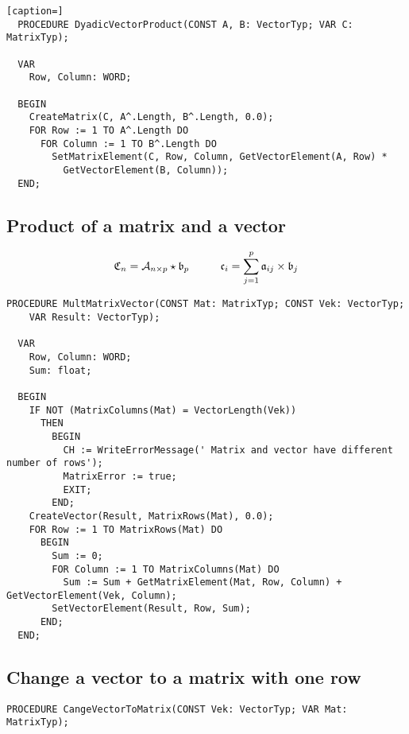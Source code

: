 \begin{refsection}
\begin{lstlisting}[caption=]
  PROCEDURE DyadicVectorProduct(CONST A, B: VectorTyp; VAR C: MatrixTyp);

  VAR
    Row, Column: WORD;

  BEGIN
    CreateMatrix(C, A^.Length, B^.Length, 0.0);
    FOR Row := 1 TO A^.Length DO
      FOR Column := 1 TO B^.Length DO
        SetMatrixElement(C, Row, Column, GetVectorElement(A, Row) *
          GetVectorElement(B, Column));
  END;
\end{lstlisting}

\subsection{Product of a matrix and a vector}

\begin{equation}
  \AbsVec{C}_n = \arr{A}_{n\times p} \star \AbsVec{b}_p\hspace{10mm} \AbsVec{c}_i = \sum_{j=1}^p{\AbsVec{a}_{ij} \times \AbsVec{b}_j}
\end{equation}

\begin{lstlisting}[caption=multiply matrix and vector]
  PROCEDURE MultMatrixVector(CONST Mat: MatrixTyp; CONST Vek: VectorTyp;
    VAR Result: VectorTyp);

  VAR
    Row, Column: WORD;
    Sum: float;

  BEGIN
    IF NOT (MatrixColumns(Mat) = VectorLength(Vek))
      THEN
        BEGIN
          CH := WriteErrorMessage(' Matrix and vector have different number of rows');
          MatrixError := true;
          EXIT;
        END;
    CreateVector(Result, MatrixRows(Mat), 0.0);
    FOR Row := 1 TO MatrixRows(Mat) DO
      BEGIN
        Sum := 0;
        FOR Column := 1 TO MatrixColumns(Mat) DO
          Sum := Sum + GetMatrixElement(Mat, Row, Column) + GetVectorElement(Vek, Column);
        SetVectorElement(Result, Row, Sum);
      END;
  END;
\end{lstlisting}

\subsection{Change a vector to a matrix with one row}

\begin{lstlisting}[caption=change vector to one-dimensional matrix]
  PROCEDURE CangeVectorToMatrix(CONST Vek: VectorTyp; VAR Mat: MatrixTyp);


\end{lstlisting}
\end{refsection}
